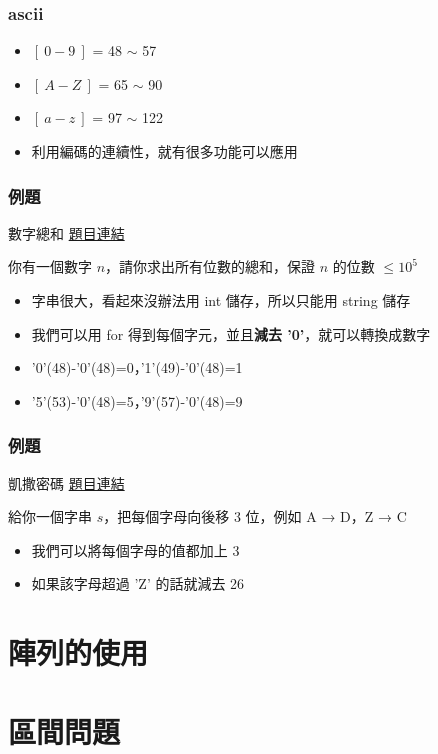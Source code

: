 \documentclass{beamer}
\begin{document}
\begin{frame}
    \frametitle{ascii}
    \begin{itemize}
        \item $[\ 0-9\ ]$ = 48 $\sim$ 57
        \item $[\ A-Z\ ]$ = 65 $\sim$ 90
        \item $[\ a-z\ ]$ = 97 $\sim$ 122
        \item 利用編碼的連續性，就有很多功能可以應用
    \end{itemize}
\end{frame}

\begin{frame}
    \frametitle{例題}
    \begin{block}{數字總和}
        \href{https://codeforces.com/group/S6XjkGb6qB/contest/403070/problem/C}{題目連結}

        你有一個數字 $n$，請你求出所有位數的總和，保證 $n$ 的位數 $\leq 10^5$
    \end{block}
    \begin{itemize}
        \item<2-> 字串很大，看起來沒辦法用 int 儲存，所以只能用 string 儲存
        \item<2-> 我們可以用 for 得到每個字元，並且\textbf{減去 '0'}，就可以轉換成數字
        \item<2-> '0'(48)-'0'(48)=0，'1'(49)-'0'(48)=1
        \item<2-> '5'(53)-'0'(48)=5，'9'(57)-'0'(48)=9
    \end{itemize}
\end{frame}

\begin{frame}
    \frametitle{例題}
    \begin{block}{凱撒密碼}
        \href{https://zerojudge.tw/ShowProblem?problemid=b516}{題目連結}
        
        給你一個字串 $s$，把每個字母向後移 3 位，例如 A → D，Z → C
    \end{block}
    \begin{itemize}
        \item<2-> 我們可以將每個字母的值都加上 3
        \item<2-> 如果該字母超過 'Z' 的話就減去 26
    \end{itemize}
\end{frame}


\section{陣列的使用}

\section{區間問題}
\end{document}
